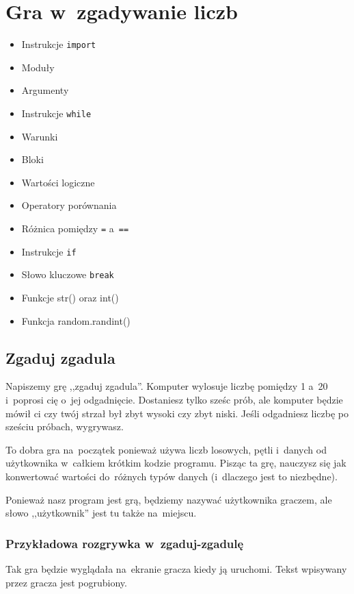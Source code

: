 \documentclass{book}
\newcommand{\btopicscovered}{
	\begin{graybox}
	\begin{itemize}
}
\newcommand{\etopicscovered}{
	\end{itemize}
	\end{graybox}
}
\begin{document}
\chapter{Gra w~zgadywanie liczb}

\btopicscovered
	\item Instrukcje \lstinline{import}
	\item Moduły
	\item Argumenty
	\item Instrukcje \lstinline{while}
	\item Warunki
	\item Bloki
	\item Wartości logiczne
	\item Operatory porównania
	\item Różnica pomiędzy \lstinline{=} a~\lstinline{==}
	\item Instrukcje \lstinline{if}
	\item Słowo kluczowe \lstinline{break}
	\item Funkcje str() oraz int()
	\item Funkcja random.randint()
\etopicscovered

\section{Zgaduj zgadula}

Napiszemy grę ,,zgaduj zgadula''. Komputer wylosuje liczbę pomiędzy 1 a~20 i~poprosi cię o~jej odgadnięcie. Dostaniesz tylko sześc prób, ale komputer będzie mówił ci czy twój strzał był zbyt wysoki czy zbyt niski. Jeśli odgadniesz liczbę po sześciu próbach, wygrywasz.

To dobra gra na~początek ponieważ używa liczb losowych, pętli i~danych od użytkownika w~całkiem krótkim kodzie programu. Pisząc ta grę, nauczysz się jak konwertować wartości do~różnych typów danych (i~dlaczego jest to niezbędne).

Ponieważ nasz program jest grą, będziemy nazywać użytkownika graczem, ale słowo ,,użytkownik'' jest tu także na~miejscu.

\subsection{Przykładowa rozgrywka w~zgaduj-zgadulę}

Tak gra będzie wyglądała na~ekranie gracza kiedy ją uruchomi. Tekst wpisywany przez gracza jest pogrubiony.
\end{document}
